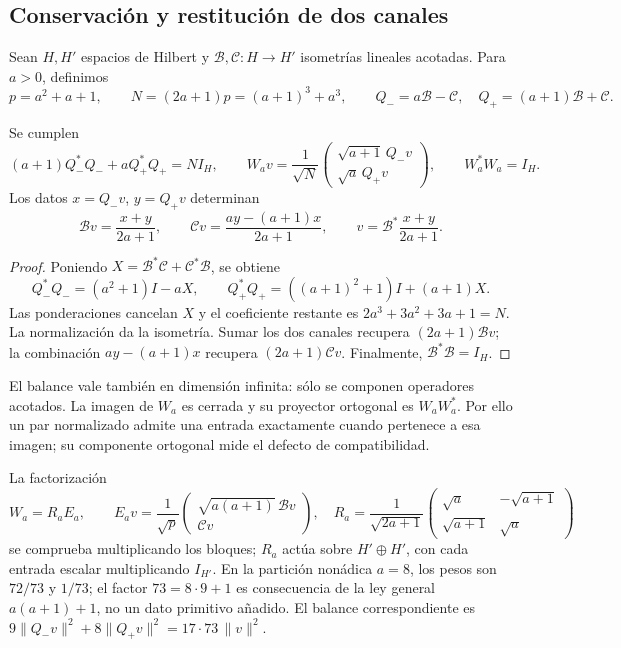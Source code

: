 \subsection{Conservación y restitución de dos canales}
\label{subsec:acoplamiento-bilateral}

Sean \(H,H'\) espacios de Hilbert y
\(\mathcal B,\mathcal C:H\to H'\) isometrías lineales acotadas.
Para \(a>0\), definimos
\[
 p=a^2+a+1,\qquad N=(2a+1)p=(a+1)^3+a^3,\qquad
 Q_-=a\mathcal B-\mathcal C,\quad Q_+=(a+1)\mathcal B+\mathcal C.
\]

\begin{theorem}
\label{thm:acoplamiento-balance}
Se cumplen
\[
 (a+1)Q_-^*Q_-+aQ_+^*Q_+=NI_H,\qquad
 W_av=\frac1{\sqrt N}
 \begin{pmatrix}\sqrt{a+1}\,Q_-v\\\sqrt a\,Q_+v\end{pmatrix},
 \qquad W_a^*W_a=I_H.
\]
Los datos \(x=Q_-v\), \(y=Q_+v\) determinan
\[
 \mathcal Bv=\frac{x+y}{2a+1},\qquad
 \mathcal Cv=\frac{ay-(a+1)x}{2a+1},\qquad
 v=\mathcal B^*\frac{x+y}{2a+1}.
\]
\end{theorem}
\begin{proof}
Poniendo \(X=\mathcal B^*\mathcal C+\mathcal C^*\mathcal B\), se obtiene
\[
 Q_-^*Q_-=(a^2+1)I-aX,\qquad
 Q_+^*Q_+=((a+1)^2+1)I+(a+1)X.
\]
Las ponderaciones cancelan \(X\) y el coeficiente restante es
\(2a^3+3a^2+3a+1=N\). La normalización da la isometría.
Sumar los dos canales recupera \((2a+1)\mathcal Bv\);
la combinación \(ay-(a+1)x\) recupera \((2a+1)\mathcal Cv\).
Finalmente, \(\mathcal B^*\mathcal B=I_H\).
\end{proof}

El balance vale también en dimensión infinita: sólo se componen
operadores acotados. La imagen de \(W_a\) es cerrada y su proyector
ortogonal es \(W_aW_a^*\). Por ello un par normalizado admite una
entrada exactamente cuando pertenece a esa imagen; su componente
ortogonal mide el defecto de compatibilidad.

La factorización
\[
 W_a=R_aE_a,\qquad
 E_av=\frac1{\sqrt p}
 \begin{pmatrix}\sqrt{a(a+1)}\,\mathcal Bv\\\mathcal Cv\end{pmatrix},
 \quad
 R_a=\frac1{\sqrt{2a+1}}
 \begin{pmatrix}\sqrt a&-\sqrt{a+1}\\
 \sqrt{a+1}&\sqrt a\end{pmatrix}
\]
se comprueba multiplicando los bloques; \(R_a\) actúa sobre
\(H'\oplus H'\), con cada entrada escalar multiplicando \(I_{H'}\).
En la partición nonádica
\(a=8\), los pesos son \(72/73\) y \(1/73\); el factor
\(73=8\cdot9+1\) es consecuencia de la ley general
\(a(a+1)+1\), no un dato primitivo añadido. El balance correspondiente es
\(9\|Q_-v\|^2+8\|Q_+v\|^2=17\cdot73\,\|v\|^2\).

